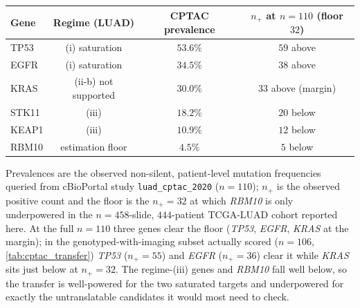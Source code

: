 \footnotesize
\setlength{\tabcolsep}{6pt}
\renewcommand{\arraystretch}{1.15}
\begin{tabular}{l c c c}
\toprule
\textbf{Gene} & \textbf{Regime (LUAD)} &
  \textbf{CPTAC prevalence} & \textbf{$n_+$ at $n\!=\!110$ (floor $32$)} \\
\midrule
TP53  & (i) saturation & $53.6\%$ & $59$ \quad above \\
EGFR  & (i) saturation & $34.5\%$ & $38$ \quad above \\
KRAS  & (ii-b) not supported & $30.0\%$ & $33$ \quad above (margin) \\
STK11 & (iii)          & $18.2\%$ & $20$ \quad below \\
KEAP1 & (iii)          & $10.9\%$ & $12$ \quad below \\
RBM10 & estimation floor & $4.5\%$ & $5$ \quad below \\
\bottomrule
\end{tabular}
\begin{flushleft}\footnotesize
Prevalences are the observed non-silent, patient-level mutation
frequencies queried from cBioPortal study \texttt{luad\_cptac\_2020}
($n\!=\!110$)\cite{gillette2020cptacluad,cptacluad_data}; $n_+$ is the
observed positive count and the floor is the $n_+\!=\!32$ at which
\emph{RBM10} is only underpowered in the $n\!=\!458$-slide, $444$-patient
TCGA-LUAD cohort
reported here. At the full $n\!=\!110$ three genes clear the floor
(\emph{TP53}, \emph{EGFR}, \emph{KRAS} at the margin); in the
genotyped-with-imaging subset actually
scored ($n\!=\!106$, \cref{tab:cptac_transfer}) \emph{TP53}
($n_+\!=\!55$) and \emph{EGFR} ($n_+\!=\!36$) clear it while \emph{KRAS}
sits just below at $n_+\!=\!32$. The regime-(iii) genes
and \emph{RBM10} fall well
below, so the transfer is well-powered for the two
saturated targets and underpowered for exactly the untranslatable
candidates it would most need to check.
\end{flushleft}
